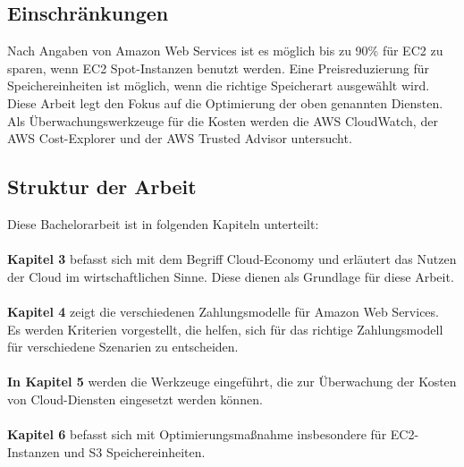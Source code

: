 \subsection{Einschränkungen}
Nach Angaben von Amazon Web Services ist es möglich bis zu 90\% für EC2 zu sparen, wenn EC2 Spot-Instanzen benutzt werden. Eine Preisreduzierung für Speichereinheiten ist möglich, wenn die richtige Speicherart ausgewählt wird. 
{\cite{AMZ08,AMZ09}} 
\\
Diese Arbeit legt den Fokus auf die Optimierung der oben genannten Diensten.
Als Überwachungswerkzeuge für die Kosten werden die AWS CloudWatch, der AWS Cost-Explorer und der AWS Trusted Advisor untersucht. 

\subsection{Struktur der Arbeit}

Diese Bachelorarbeit ist in folgenden Kapiteln unterteilt:\\\\
\textbf{Kapitel 3} 
befasst sich mit dem Begriff Cloud-Economy und erläutert das Nutzen der Cloud im wirtschaftlichen Sinne. Diese dienen als Grundlage für diese Arbeit. \\\\
\textbf{Kapitel 4} 
zeigt die verschiedenen Zahlungsmodelle für Amazon Web Services. 
\\
Es werden Kriterien vorgestellt, die helfen, sich für das richtige Zahlungsmodell für verschiedene Szenarien zu entscheiden. 
\\\\
\textbf{In Kapitel 5} werden die Werkzeuge eingeführt, die zur Überwachung der Kosten von Cloud-Diensten eingesetzt werden können.
\\\\
\textbf{Kapitel 6} befasst sich mit Optimierungsmaßnahme insbesondere für EC2-Instanzen und S3 Speichereinheiten.

 

